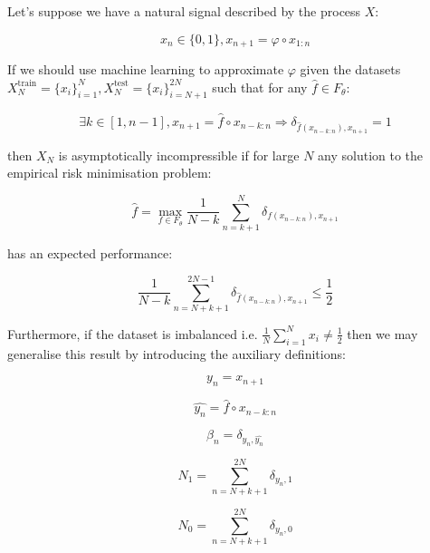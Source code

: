 \documentclass{article}
\begin{document}
Let's suppose we have a natural signal described by the process $X$: 

\begin{equation}
x_n \in \{0,1\}, x_{n+1} = \varphi \circ x_{1:n}	
\end{equation}

If we should use machine learning to approximate $\varphi$ given the datasets 
$X_N^{\text{train}}= \{x_i\}_{i=1}^N,X_N^{\text{test}}= \{x_i\}_{i=N+1}^{2N}$
such that for any $\hat{f} \in F_{\theta}$: 

\begin{equation}
\exists k \in [1,n-1], x_{n+1} = \hat{f} \circ x_{n-k:n} \Rightarrow \delta_{\hat{f}(x_{n-k:n}),x_{n+1}} = 1	
\end{equation}

then $X_N$ is asymptotically incompressible if for large $N$ any solution to the 
empirical risk minimisation problem: 

\begin{equation}
\hat{f} = \max_{f \in F_{\theta}} \frac{1}{N-k} \sum_{n=k+1}^N \delta_{f(x_{n-k:n}),x_{n+1}}
\end{equation}

has an expected performance: 

\begin{equation}
\frac{1}{N-k} \sum_{n=N+k+1}^{2N-1} \delta_{\hat{f}(x_{n-k:n}),x_{n+1}}
 \leq \frac{1}{2}
\end{equation}

Furthermore, if the dataset is imbalanced i.e. $\frac{1}{N} \sum_{i=1}^N x_i \neq \frac{1}{2}$ then we may generalise this result by introducing the auxiliary definitions: 

\begin{equation}
y_n = x_{n+1}	
\end{equation}

\begin{equation}
\hat{y_n} = \hat{f} \circ x_{n-k:n}
\end{equation}

\begin{equation}
\beta_n = \delta_{y_n,\hat{y_n}}	
\end{equation}

\begin{equation}
N_1 = \sum_{n=N+k+1}^{2N} \delta_{y_n,1}	
\end{equation}

\begin{equation}
N_0 = \sum_{n=N+k+1}^{2N} \delta_{y_n,0}	
\end{equation}
\end{document}
